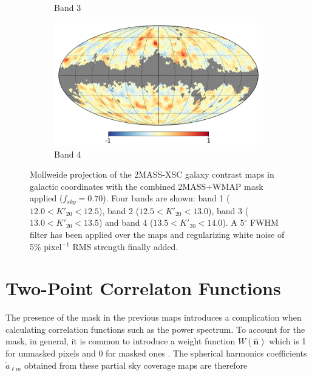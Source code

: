 \documentclass[openany,a4paper,12pt,oneside]{book}
\begin{document}
\begin{spacing}{1.5}
\begin{figure}[!htb]
\begin{subfigure}[b]{0.495\textwidth}
         \caption{Band 3}
         \label{fig:contrast_map3}
     \end{subfigure}
     \hfill
     \begin{subfigure}[b]{0.495\textwidth}
         \centering
         \includegraphics[width=\textwidth]{Imagens/band4_wmask_xsc.png}
         \caption{Band 4}
         \label{fig:contrast_map4}
     \end{subfigure}
     \caption{Mollweide projection of the 2MASS-XSC galaxy contrast maps in galactic coordinates with the combined 2MASS+WMAP mask applied ($f_{sky}=0.70$). Four bands are shown: band 1 ($12.0<K'_{20}<12.5$), band 2 ($12.5<K'_{20}<13.0$), band 3 ($13.0<K'_{20}<13.5$) and band 4 ($13.5<K'_{20}<14.0$). A 5$^{\circ}$ FWHM filter has been applied over the maps and regularizing white noise of 5\%  pixel$^{-1}$ RMS strength finally added.}
        \label{fig:2MASS_maps}
      \end{figure}

      
\section{Two-Point Correlaton Functions}


The presence of the mask in the previous maps introduces a complication when calculating correlation functions such as the power spectrum. To account for the mask, in general, it is common to introduce a weight function $W(\hat{\mathbf{n}})$ which is 1 for unmasked pixels and 0 for masked ones \cite{Hivon_2002}. The spherical harmonics coefficients $\tilde{a}_{\ell m}$ obtained from these partial sky coverage maps are therefore


\end{spacing}
\end{document}
